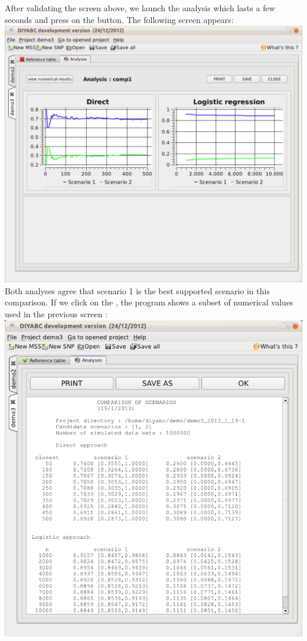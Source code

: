 After validating the screen above, we launch the analysis which lasts a few seconds and press on the  button. The following screen appears:\\

 \includegraphics[scale=0.3]{gui_pictures/Capture-DIYABC-111.png} \\

Both analyses agree that scenario 1 is the best supported scenario in this comparison. If we click on the , the program shows a subset of numerical values used in the previous screen :\\

 \includegraphics[scale=0.3]{gui_pictures/Capture-DIYABC-112.png} \\

